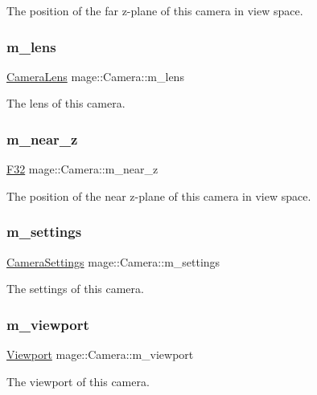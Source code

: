 The position of the far z-\/plane of this camera in view space. \hypertarget{classmage_1_1_camera_a1fe77374724cc14506cecbc59fe77c53}{}\label{classmage_1_1_camera_a1fe77374724cc14506cecbc59fe77c53} 
\subsubsection{\texorpdfstring{m\+\_\+lens}{m\_lens}}
{\footnotesize\ttfamily \hyperlink{classmage_1_1_camera_lens}{Camera\+Lens} mage\+::\+Camera\+::m\+\_\+lens\hspace{0.3cm}{\ttfamily [private]}}

The lens of this camera. \hypertarget{classmage_1_1_camera_a8ae2c8fbe94cb6f8c4cd4a2811900b83}{}\label{classmage_1_1_camera_a8ae2c8fbe94cb6f8c4cd4a2811900b83} 
\subsubsection{\texorpdfstring{m\+\_\+near\+\_\+z}{m\_near\_z}}
{\footnotesize\ttfamily \hyperlink{namespacemage_aa97e833b45f06d60a0a9c4fc22ae02c0}{F32} mage\+::\+Camera\+::m\+\_\+near\+\_\+z\hspace{0.3cm}{\ttfamily [private]}}

The position of the near z-\/plane of this camera in view space. \hypertarget{classmage_1_1_camera_a922a7d227da929739167bf1c90a14d77}{}\label{classmage_1_1_camera_a922a7d227da929739167bf1c90a14d77} 
\subsubsection{\texorpdfstring{m\+\_\+settings}{m\_settings}}
{\footnotesize\ttfamily \hyperlink{classmage_1_1_camera_settings}{Camera\+Settings} mage\+::\+Camera\+::m\+\_\+settings\hspace{0.3cm}{\ttfamily [private]}}

The settings of this camera. \hypertarget{classmage_1_1_camera_aab06bebec3532a3b7afe735aaf316b7d}{}\label{classmage_1_1_camera_aab06bebec3532a3b7afe735aaf316b7d} 
\subsubsection{\texorpdfstring{m\+\_\+viewport}{m\_viewport}}
{\footnotesize\ttfamily \hyperlink{classmage_1_1_viewport}{Viewport} mage\+::\+Camera\+::m\+\_\+viewport\hspace{0.3cm}{\ttfamily [private]}}

The viewport of this camera. 